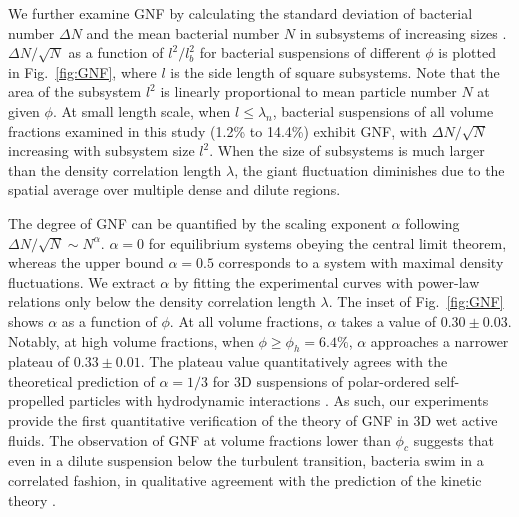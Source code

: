 \documentclass[twocolumn,aps,prx,amsmath,amssymb,longbibliography]{revtex4-2}
\begin{document}
We further examine GNF by calculating the standard deviation of bacterial number $\Delta N$ and the mean bacterial number $N$ in subsystems of increasing sizes \cite{Liu2020}. $\Delta N / \sqrt N$ as a function of $l^2/l_b^2$ for bacterial suspensions of different $\phi$ is plotted in Fig.~\ref{fig:GNF}, where $l$ is the side length of square subsystems.
Note that the area of the subsystem $l^2$ is linearly proportional to mean particle number $N$ at given $\phi$. At small length scale, when $l\le\lambda_n$, bacterial suspensions of all volume fractions examined in this study (1.2\% to 14.4\%) exhibit GNF, with $\Delta N/\sqrt N$ increasing with subsystem size $l^2$. When the size of subsystems is much larger than the density correlation length $\lambda$, the giant fluctuation diminishes due to the spatial average over multiple dense and dilute regions.

The degree of GNF can be quantified by the scaling exponent $\alpha$ following $\Delta N/\sqrt{N} \sim N^\alpha$. $\alpha=0$ for equilibrium systems obeying the central limit theorem, whereas the upper bound $\alpha = 0.5$ corresponds to a system with maximal density fluctuations.
We extract $\alpha$ by fitting the experimental curves with power-law relations only below the density correlation length $\lambda$. The inset of Fig.~\ref{fig:GNF} shows $\alpha$ as a function of $\phi$.
At all volume fractions, $\alpha$ takes a value of $0.30 \pm 0.03$. Notably, at high volume fractions, when $\phi \geq \phi_h = 6.4\%$, $\alpha$ approaches a narrower plateau of $0.33 \pm 0.01$.
The plateau value quantitatively agrees with the theoretical prediction of $\alpha = 1/3$ for 3D suspensions of polar-ordered self-propelled particles with hydrodynamic interactions \cite{AditiSimha2002}. As such, our experiments provide the first quantitative verification of the theory of GNF in 3D wet active fluids.
The observation of GNF at volume fractions lower than $\phi_c$ suggests that even in a dilute suspension below the turbulent transition, bacteria swim in a correlated fashion, in qualitative agreement with the prediction of the kinetic theory \cite{Stenhammar2017}.
\end{document}
